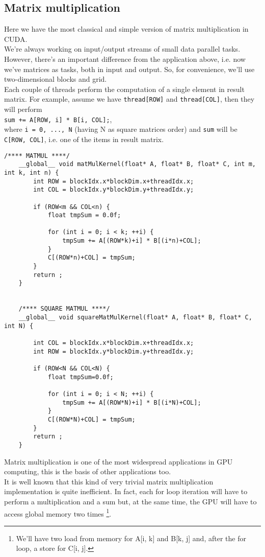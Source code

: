 \subsection{Matrix multiplication}
	Here we have the most classical and simple version of matrix multiplication in CUDA.\\
	We're always working on input/output streams of small data parallel tasks.
    However, there's an important difference from the application above, i.e. now we've matrices as tasks, both in input and output. So, for convenience, we'll use two-dimensional blocks and grid.\\  
	Each couple of threads perform the computation of a single element in result matrix. For example, assume we have \texttt{thread[ROW]} and \texttt{thread[COL]}, then they will perform\\ \texttt{sum += A[ROW, i] * B[i, COL];},\\ where \texttt{i = 0, ..., N} (having N as square matrices order) and \texttt{sum} will be \texttt{C[ROW, COL]}, i.e. one of the items in result matrix\cite{cudaguide,matmul}.
	\begin{lstlisting}[caption={Implementation for Matrix Multiplication Kernel, both non-square and square}]
	/**** MATMUL ****/
	__global__ void matMulKernel(float* A, float* B, float* C, int m, int k, int n) {   
		int ROW = blockIdx.x*blockDim.x+threadIdx.x;
		int COL = blockIdx.y*blockDim.y+threadIdx.y;
		
		if (ROW<m && COL<n) {
			float tmpSum = 0.0f;			
	
			for (int i = 0; i < k; ++i) {
				tmpSum += A[(ROW*k)+i] * B[(i*n)+COL];
			}        
			C[(ROW*n)+COL] = tmpSum;
		}
		return ;
	}
	
		
	/**** SQUARE MATMUL ****/
	__global__ void squareMatMulKernel(float* A, float* B, float* C, int N) {

		int COL = blockIdx.x*blockDim.x+threadIdx.x;
		int ROW = blockIdx.y*blockDim.y+threadIdx.y;
		
		if (ROW<N && COL<N) {
			float tmpSum=0.0f;        
		
			for (int i = 0; i < N; ++i) {
				tmpSum += A[(ROW*N)+i] * B[(i*N)+COL];
			}        
			C[(ROW*N)+COL] = tmpSum;        
		}
		return ;
	}
	\end{lstlisting}
	Matrix multiplication is one of the most widespread applications in GPU computing, this is the basis of other applications too.\\
	It is well known that this kind of very trivial matrix multiplication implementation is quite inefficient. In fact, each for loop iteration will have to perform a multiplication and a sum but, at the same time, the GPU will have to access global memory two times \footnote{We'll have two load from memory for A[i, k] and B[k, j] and, after the for loop, a store for C[i, j].}.\\
